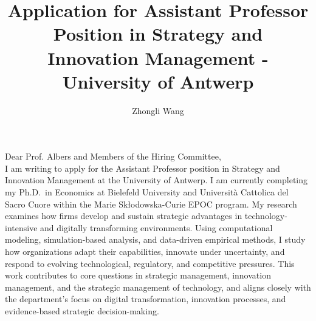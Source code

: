 \documentclass{nfr}
\title{Application for Assistant Professor Position in Strategy and Innovation Management - University of Antwerp}
\author{Zhongli Wang}
\begin{document}

% 
% 
% 
% 


\maketitle


\noindent Dear Prof. Albers and Members of the Hiring Committee,\\[0.2cm]

I am writing to apply for the Assistant Professor position in Strategy and Innovation Management at the University of Antwerp. 
I am currently completing my Ph.D.\ in Economics at Bielefeld University and Università Cattolica del Sacro Cuore within the Marie Skłodowska-Curie EPOC program. 
My research examines how firms develop and sustain strategic advantages in technology-intensive and digitally transforming environments. 
Using computational modeling, simulation-based analysis, and data-driven empirical methods, I study how organizations adapt their capabilities, innovate under uncertainty, and respond to evolving technological, regulatory, and competitive pressures. 
This work contributes to core questions in strategic management, innovation management, and the strategic management of technology, and aligns closely with the department’s focus on digital transformation, innovation processes, and evidence-based strategic decision-making.\\
\end{document}
